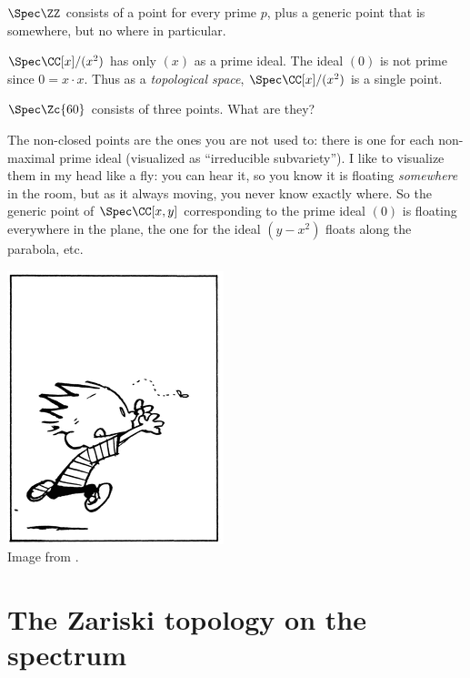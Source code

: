 \begin{example}
	\listhack
	\begin{enumerate}[(a)]
		\ii $\Spec \ZZ$ consists of a point for every prime $p$,
		plus a generic point that is somewhere, but no where in particular.

		\ii $\Spec \CC[x] / (x^2)$ has only $(x)$ as a prime ideal.
		The ideal $(0)$ is not prime since $0 = x \cdot x$.
		Thus as a \emph{topological space},
		$\Spec \CC[x] / (x^2)$ is a single point.
		
		\ii $\Spec \Zc{60}$ consists of three points.
		What are they?
	\end{enumerate}
\end{example}

The non-closed points are the ones you are not used to:
there is one for each non-maximal prime ideal
(visualized as ``irreducible subvariety'').
I like to visualize them in my head like a fly:
you can hear it, so you know it is floating \emph{somewhere} in the room,
but as it always moving, you never know exactly where.
So the generic point of $\Spec \CC[x,y]$ corresponding to the prime
ideal $(0)$ is floating everywhere in the plane,
the one for the ideal $(y-x^2)$ floats along the parabola, etc.
\begin{center}
	\includegraphics[scale=0.4]{media/calvin-hobbes-fly.png} \\
	\footnotesize Image from \cite{img:calvin_hobbes_fly}.
\end{center}

\section{The Zariski topology on the spectrum}

